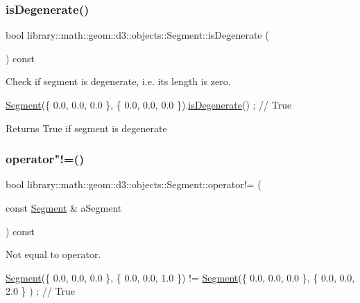 \subsubsection{\texorpdfstring{is\+Degenerate()}{isDegenerate()}}
{\footnotesize\ttfamily bool library\+::math\+::geom\+::d3\+::objects\+::\+Segment\+::is\+Degenerate (\begin{DoxyParamCaption}{ }\end{DoxyParamCaption}) const}



Check if segment is degenerate, i.\+e. its length is zero. 


\begin{DoxyCode}
\hyperlink{classlibrary_1_1math_1_1geom_1_1d3_1_1objects_1_1_segment_a5562342d1edf2f52e37ce1bc138ee7d7}{Segment}(\{ 0.0, 0.0, 0.0 \}, \{ 0.0, 0.0, 0.0 \}).\hyperlink{classlibrary_1_1math_1_1geom_1_1d3_1_1objects_1_1_segment_a11324bd27db3ef9d931fdee763246759}{isDegenerate}() ; \textcolor{comment}{// True}
\end{DoxyCode}


\begin{DoxyReturn}{Returns}
True if segment is degenerate 
\end{DoxyReturn}
\mbox{\label{classlibrary_1_1math_1_1geom_1_1d3_1_1objects_1_1_segment_ad408a3c17a4048183c4b646ec6cf91e9}} 
\subsubsection{\texorpdfstring{operator"!=()}{operator!=()}}
{\footnotesize\ttfamily bool library\+::math\+::geom\+::d3\+::objects\+::\+Segment\+::operator!= (\begin{DoxyParamCaption}\item[{const \hyperlink{classlibrary_1_1math_1_1geom_1_1d3_1_1objects_1_1_segment}{Segment} \&}]{a\+Segment }\end{DoxyParamCaption}) const}



Not equal to operator. 


\begin{DoxyCode}
\hyperlink{classlibrary_1_1math_1_1geom_1_1d3_1_1objects_1_1_segment_a5562342d1edf2f52e37ce1bc138ee7d7}{Segment}(\{ 0.0, 0.0, 0.0 \}, \{ 0.0, 0.0, 1.0 \}) != \hyperlink{classlibrary_1_1math_1_1geom_1_1d3_1_1objects_1_1_segment_a5562342d1edf2f52e37ce1bc138ee7d7}{Segment}(\{ 0.0, 0.0, 0.0 \}, \{ 0.0, 0.0, 2.0 \}
      ) ; \textcolor{comment}{// True}
\end{DoxyCode}



